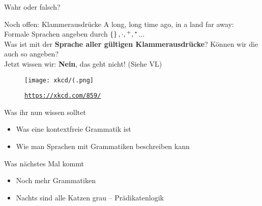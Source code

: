 \begin{frame}[t]{Wahr oder falsch?}
\end{frame}

%

%

\begin{frame}{Noch offen: Klammerausdrücke}
	A long, long time ago, in a land far away:\\
	\medskip
	Formale Sprachen angeben durch $\left\{\right\}, \cdot, {}^+, {}^*$...\\
	Was ist mit der \textbf{Sprache aller gültigen Klammerausdrücke}? Können wir die auch so angeben?\\[1em]
	\pause
	\impl Jetzt wissen wir: \textbf{Nein}, das geht nicht! (Siehe VL)\\[1em]
	
	\begin{figure}[H]
		\centering
		\texttt{[image: xkcd/(.png]}
		\vspace{-7pt}
		\caption{ \texttt{\url{https://xkcd.com/859/}} }
	\end{figure}
\end{frame}



\begin{frame}	
	\begin{block}{Was ihr nun wissen solltet}
		\begin{itemize}
			\item Was eine kontextfreie Grammatik ist
			\item Wie man Sprachen mit Grammatiken beschreiben kann
		\end{itemize}
	\end{block}
	
	\begin{block}{Was nächstes Mal kommt}
		\begin{itemize}
			\item Noch mehr Grammatiken
			\item Nachts sind alle Katzen grau -- Prädikatenlogik
		\end{itemize}
	\end{block}
\end{frame}	


\slideThanks

